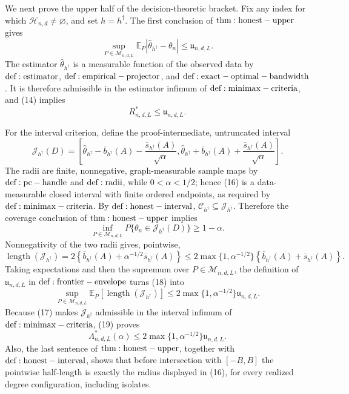 We next prove the upper half of the decision-theoretic bracket.  Fix any index for which \(\mathcal H_{n,d}\ne\varnothing\), and set \(h=h^\dagger\).  The first conclusion of \({\rm thm:honest-upper}\) gives
\[
 \sup_{P\in\mathcal M_{n,d,L}}
 \mathbb E_P|\widehat\theta_{h^\dagger}-\theta_n|
 \le \mathfrak u_{n,d,L}.
\tag{14}
\]
The estimator \(\widehat\theta_{h^\dagger}\) is a measurable function of the observed data by \({\rm def:estimator}\), \({\rm def:empirical-projector}\), and \({\rm def:exact-optimal-bandwidth}\).  It is therefore admissible in the estimator infimum of \({\rm def:minimax-criteria}\), and (14) implies
\[
 R^*_{n,d,L}\le\mathfrak u_{n,d,L}.
\tag{15}
\]

For the interval criterion, define the proof-intermediate, untruncated interval
\[
 \mathcal J_{h^\dagger}(D)=
 \left[
 \widehat\theta_{h^\dagger}-\overline b_{h^\dagger}(A)
 -\frac{\overline s_{h^\dagger}(A)}{\sqrt\alpha},
 \widehat\theta_{h^\dagger}+\overline b_{h^\dagger}(A)
 +\frac{\overline s_{h^\dagger}(A)}{\sqrt\alpha}
 \right].
\tag{16}
\]
The radii are finite, nonnegative, graph-measurable sample maps by \({\rm def:pc-handle}\) and \({\rm def:radii}\), while \(0<\alpha<1/2\); hence (16) is a data-measurable closed interval with finite ordered endpoints, as required by \({\rm def:minimax-criteria}\).  By \({\rm def:honest-interval}\), \(\mathcal C_{h^\dagger}\subseteq\mathcal J_{h^\dagger}\).  Therefore the coverage conclusion of \({\rm thm:honest-upper}\) implies
\[
 \inf_{P\in\mathcal M_{n,d,L}}
 P\{\theta_n\in\mathcal J_{h^\dagger}(D)\}
 \ge1-\alpha.
\tag{17}
\]
Nonnegativity of the two radii gives, pointwise,
\[
 \operatorname{length}(\mathcal J_{h^\dagger})
 =2\left\{\overline b_{h^\dagger}(A)
 +\alpha^{-1/2}\overline s_{h^\dagger}(A)\right\}
 \le2\max\{1,\alpha^{-1/2}\}
 \left\{\overline b_{h^\dagger}(A)+\overline s_{h^\dagger}(A)\right\}.
\tag{18}
\]
Taking expectations and then the supremum over \(P\in\mathcal M_{n,d,L}\), the definition of \(\mathfrak u_{n,d,L}\) in \({\rm def:frontier-envelope}\) turns (18) into
\[
 \sup_{P\in\mathcal M_{n,d,L}}
 \mathbb E_P\!\left[\operatorname{length}(\mathcal J_{h^\dagger})\right]
 \le2\max\{1,\alpha^{-1/2}\}\mathfrak u_{n,d,L}.
\tag{19}
\]
Because (17) makes \(\mathcal J_{h^\dagger}\) admissible in the interval infimum of \({\rm def:minimax-criteria}\), (19) proves
\[
 \Lambda^*_{n,d,L}(\alpha)
 \le2\max\{1,\alpha^{-1/2}\}\mathfrak u_{n,d,L}.
\tag{20}
\]
Also, the last sentence of \({\rm thm:honest-upper}\), together with \({\rm def:honest-interval}\), shows that before intersection with \([-B,B]\) the pointwise half-length is exactly the radius displayed in (16), for every realized degree configuration, including isolates.

